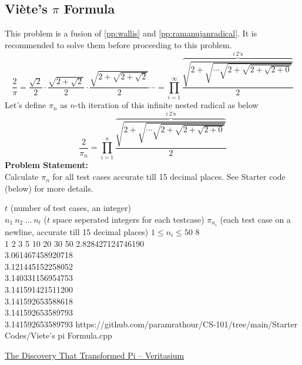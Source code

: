 \subsection{Viète's $\pi$ Formula}{\label{pp:vietesformula}}
This problem is a fusion of \ref{pp:wallis} and \ref{pp:ramanujanradical}. It is recommended to solve them before proceeding to this problem.
\begin{equation}
{ {\frac {2}{\pi }}={\frac {\sqrt {2}}{2}}\cdot {\frac {\sqrt {2+{\sqrt {2}}}}{2}}\cdot {\frac {\sqrt {2+{\sqrt {2+{\sqrt {2}}}}}}{2}}\cdots = \prod_{i = 1}^{\infty} \frac{\overbrace{\sqrt{2+\sqrt{\cdots{\sqrt{2+{\sqrt{2+\sqrt{2+0}}}}}}}}^{i\ 2\text{'s}}}{2}}
	\end{equation}
Let's define $\pi_n$ as $n$-th iteration of this infinite nested radical as below
\begin{equation*}
\frac{2}{\pi_n} = \prod_{i = 1}^{n} \frac{\overbrace{\sqrt{2+\sqrt{\cdots{\sqrt{2+{\sqrt{2+\sqrt{2+0}}}}}}}}^{i\ 2\text{'s}}}{2}
\end{equation*}
\textbf{Problem Statement:}\\
Calculate $\pi_n$ for all test cases accurate till 15 decimal places. See Starter code (below) for more details.
\begin{testcases}
	{$t$ \hfill(number of test cases, an integer)\\$n_1\ n_2\ \ldots\ n_t$ \hfill($t$ space seperated integers for each testcase)}
	{$\pi_{n_i}$ \hfill(each test case on a newline, accurate till 15 decimal places)}
	{$1 \leq n_i \leq 50$}
	{8\\1 2 3 5 10 20 30 50}
	{2.828427124746190\\3.061467458920718\\3.121445152258052\\3.140331156954753\\3.141591421511200\\3.141592653588618\\3.141592653589793\\3.141592653589793}
	{https://github.com/paramrathour/CS-101/tree/main/Starter Codes/Viete's pi Formula.cpp}
\end{testcases}
\begin{funvideo}
\href{https://youtu.be/gMlf1ELvRzc}{The Discovery That Transformed Pi -- Veritasium}
\end{funvideo}